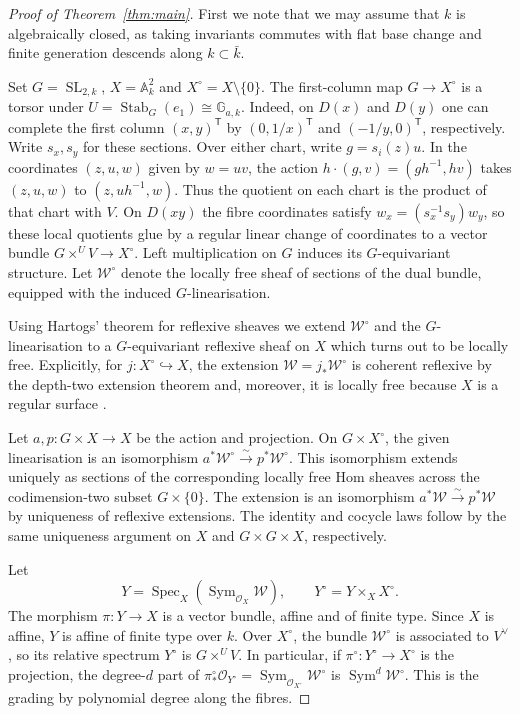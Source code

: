 \documentclass[11pt]{amsart}
\theoremstyle{plain}
\numberwithin{equation}{section}
\DeclareMathOperator{\SL}{SL}
\DeclareMathOperator{\Stab}{Stab}
\DeclareMathOperator{\Sym}{Sym}
\begin{document}
\begin{proof}[Proof of Theorem~\ref{thm:main}]
First we note that we may assume that \(k\) is algebraically closed, as taking invariants commutes with flat base change and finite generation descends along \(k \subset \bar{k}\).

Set \(G=\SL_{2,k}\), \(X=\mathbb A^2_k\) and \(X^\circ=X\setminus\{0\}\).
The first-column map \(G\to X^\circ\) is a torsor under \(U=\Stab_G(e_1)\cong\mathbb G_{a,k}\).
Indeed, on \(D(x)\) and \(D(y)\) one can complete the first column \((x,y)^{\mathsf T}\) by \((0,1/x)^{\mathsf T}\) and \((-1/y,0)^{\mathsf T}\), respectively.
Write \(s_x,s_y\) for these sections.
Over either chart, write \(g=s_i(z)u\).
In the coordinates \((z,u,w)\) given by \(w=uv\), the action \(h\cdot(g,v)=(gh^{-1},hv)\) takes \((z,u,w)\) to \((z,uh^{-1},w)\).
Thus the quotient on each chart is the product of that chart with \(V\).
On \(D(xy)\) the fibre coordinates satisfy \(w_x=(s_x^{-1}s_y)w_y\), so these local quotients glue by a regular linear change of coordinates to a vector bundle \(G\times^U V\to X^\circ\).
Left multiplication on \(G\) induces its \(G\)-equivariant structure.
Let \(\mathcal W^\circ\) denote the locally free sheaf of sections of the dual bundle, equipped with the induced \(G\)-linearisation.

Using Hartogs' theorem for reflexive sheaves we extend \(\mathcal W^\circ\) and the \(G\)-linearisation to a \(G\)-equivariant reflexive sheaf on \(X\) which turns out to be locally free.
Explicitly, for \(j\colon X^\circ\hookrightarrow X\), the extension \(\mathcal W=j_*\mathcal W^\circ\) is coherent reflexive by the depth-two extension theorem and, moreover, it is locally free because \(X\) is a regular surface \cite[Tags \href{https://stacks.math.columbia.edu/tag/0EBJ}{0EBJ} and \href{https://stacks.math.columbia.edu/tag/0B3N}{0B3N}]{Stacks}.

Let \(a,p\colon G\times X\to X\) be the action and projection.
On \(G\times X^\circ\), the given linearisation is an isomorphism \(a^*\mathcal W^\circ\xrightarrow{\sim}p^*\mathcal W^\circ\).
This isomorphism extends uniquely as sections of the corresponding locally free Hom sheaves across the codimension-two subset \(G\times\{0\}\).
The extension is an isomorphism \(a^*\mathcal W\xrightarrow{\sim}p^*\mathcal W\) by uniqueness of reflexive extensions.
The identity and cocycle laws follow by the same uniqueness argument on \(X\) and \(G\times G\times X\), respectively.

Let
\[
Y=\operatorname{Spec}_X(\Sym_{\mathcal O_X}\mathcal W),
\qquad
Y^\circ=Y\times_X X^\circ.
\]
The morphism \(\pi\colon Y\to X\) is a vector bundle, affine and of finite type.
Since \(X\) is affine, \(Y\) is affine of finite type over \(k\).
Over \(X^\circ\), the bundle \(\mathcal W^\circ\) is associated to \(V^\vee\), so its relative spectrum \(Y^\circ\) is \(G\times^U V\).
In particular, if \(\pi^\circ\colon Y^\circ\to X^\circ\) is the projection, the degree-\(d\) part of \(\pi^\circ_*\mathcal O_{Y^\circ}=\Sym_{\mathcal O_{X^\circ}}\mathcal W^\circ\) is \(\Sym^d\mathcal W^\circ\).
This is the grading by polynomial degree along the fibres.


\end{proof}
\end{document}
